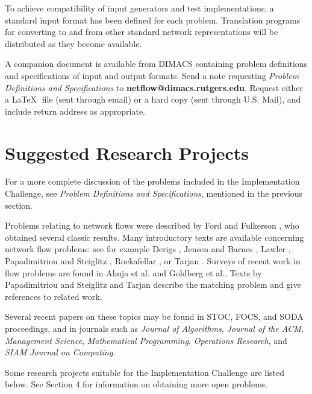 To achieve compatibility of input generators and test implementations,
a standard  input format has been defined for each problem. 
Translation programs for converting to and from other standard network 
representations  will be distributed as they become available. 

A companion document is available from DIMACS 
containing problem definitions and specifications of input and output formats. 
Send a note requesting {\em Problem Definitions and Specifications}
to {\bf netflow@dimacs.rutgers.edu}. 
Request either a \LaTeX$\;$ file (sent through email) or a hard copy
(sent through U.S. Mail), and include return address as appropriate.  

\section{Suggested Research Projects} 

For a more complete discussion of the problems included in the
Implementation Challenge, see {\em Problem Definitions and 
Specifications}, mentioned in the previous section.  

Problems relating to network flows were described by Ford and Fulkerson
\cite{forful}, who obtained  several classic results.  Many introductory
texts are available concerning network flow problems:  see for 
example Derigs \cite{derigs}, 
Jensen and Barnes \cite{jenbar}, Lawler \cite{lawler},
Papadimitriou and Steiglitz \cite{papste},  
Rockafellar \cite{rockafellar}, or  Tarjan \cite{tarjan}. 
Surveys of recent work in flow problems are found in 
Ahuja et al. \cite{amo} and Goldberg et al.\cite{gtt}. 
Texts by Papadimitriou and Steiglitz \cite{papste} and 
Tarjan \cite{tarjan} describe the matching problem and give 
references to related work. 

Several recent papers on these topics may 
be found in STOC, FOCS, and SODA proceedings, and in journals such as 
{\em Journal of Algorithms}, {\em Journal of the ACM},
{\em Management Science}, 
{\em Mathematical Programming}, 
{\em Operations Research}, and {\em SIAM Journal on Computing}. 

Some research projects suitable for the Implementation Challenge are
listed below.  See Section 4 for information on obtaining more open problems. 

